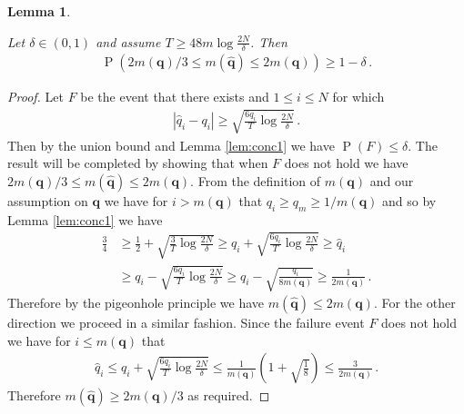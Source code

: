 \documentclass[11pt,a4paper,oneside]{book}
\newcommand{\eq}[1]{\begin{align*}#1\end{align*}}
\renewcommand{\P}[1]{\operatorname{P}\left(#1\right)}
\renewcommand{\vec}[1]{\boldsymbol{#1}}
\theoremstyle{plain}
\newtheorem{lemma}[theorem]{Lemma}
\theoremstyle{definition}
\begin{document}
\begin{lemma}\label{lem:m_est}

Let $\delta \in (0,1)$ and assume $T \geq 48m \log\frac{2N}{\delta}$. Then
\eq{
\P{2m(\vec{q}) / 3 \leq m(\vec{\hat q}) \leq 2m(\vec{q})} \geq 1 - \delta\,.
}
\end{lemma}

\begin{proof}
Let $F$ be the event that there exists and $1 \leq i \leq N$ for which
\eq{
\left|\hat q_i - q_i\right| \geq \sqrt{\frac{6q_i}{T} \log \frac{2N}{\delta}}\,.
}
Then by the union bound and Lemma \ref{lem:conc1} we have $\P{F} \leq \delta$. The result will be completed by showing that
when $F$ does not hold we have $2m(\vec{q})/3 \leq m(\vec{\hat q}) \leq 2m(\vec{q})$.
From the definition of $m(\vec{q})$ and our assumption on $\vec{q}$ we have for $i > m(\vec{q})$ that $q_i \geq q_m \geq 1/m(\vec{q})$ and so by Lemma \ref{lem:conc1} we have
\eq{
\frac{3}{4} 
&\geq \frac{1}{2} + \sqrt{\frac{3}{T} \log \frac{2N}{\delta}} 
\geq q_i + \sqrt{\frac{6q_i}{T} \log \frac{2N}{\delta}} 
\geq \hat q_i \\
&\geq q_i - \sqrt{\frac{6q_i}{T} \log \frac{2N}{\delta}}
\geq q_i - \sqrt{\frac{q_i}{8m(\vec{q})}}
\geq \frac{1}{2m(\vec{q})}\,.
}
Therefore by the pigeonhole principle we have $m(\vec{\hat q}) \leq 2m(\vec{q})$.
For the other direction we proceed in a similar fashion. Since the failure event $F$ does not hold we have for $i \leq m(\vec{q})$ that
\eq{
\hat q_i 
\leq q_i + \sqrt{\frac{6q_i}{T} \log\frac{2N}{\delta}} 
\leq \frac{1}{m(\vec{q})} \left(1 + \sqrt{\frac{1}{8}}\right)
\leq \frac{3}{2m(\vec{q})}\,.
}
Therefore $m(\vec{\hat q}) \geq 2m(\vec{q}) / 3$ as required. 
\end{proof}
\end{document}

